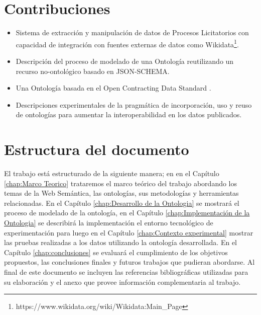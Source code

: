 \section{Contribuciones}
\label{Contribuciones}
\begin{itemize}
\item \label{contrib:1}Sistema de extracción y manipulación de datos de Procesos Licitatorios con capacidad de integración con fuentes externas de datos como Wikidata\footnote{https://www.wikidata.org/wiki/Wikidata:Main_Page}.
\item \label{contrib:2}Descripción del proceso de modelado de una Ontología reutilizando un recurso no-ontológico basado en JSON-SCHEMA\cite {JSONSche10:online}.
\item \label{contrib:3}Una Ontología basada en el Open Contracting Data Standard \cite{OCDSReleaseSchema:online}.
\item \label{contrib:4}Descripciones experimentales de la pragmática de incorporación, uso y reuso de ontologías para aumentar la interoperabilidad en los datos publicados.

\end{itemize}
 

\section{Estructura del documento}
El trabajo está estructurado de la siguiente manera; en  en el  Capítulo \ref{chap:Marco Teorico}  trataremos el marco teórico del trabajo abordando los temas de la Web Semántica, las ontologías, sus metodologías y herramientas relacionadas. En el Capítulo \ref{chap:Desarrollo de la Ontologia} se mostrará el proceso de modelado de la ontología, en el Capítulo \ref{chap:Implementación de la Ontologia} se describirá la implementación el entorno tecnológico de experimentación para luego en el Capítulo  \ref{chap:Contexto experimental} mostrar las pruebas realizadas a los datos utilizando la ontología desarrollada. En el Capítulo \ref{chap:conclusiones} se evaluará el cumplimiento de los objetivos propuestos, las conclusiones finales y futuros trabajos que pudieran abordarse. Al final de este documento  se  incluyen las referencias bibliográficas utilizadas para su elaboración y el anexo que provee información complementaria al trabajo.


